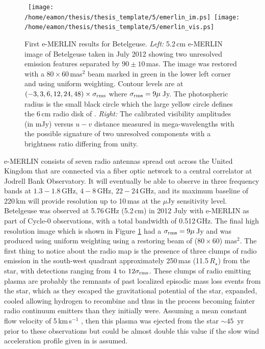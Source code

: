 \begin{figure}[!ht]
\centering 
\mbox{
          \texttt{[image: /home/eamon/thesis/thesis\_template/5/emerlin\_im.ps]}
          \texttt{[image: /home/eamon/thesis/thesis\_template/5/emerlin\_vis.ps]}
          }
\caption[First e-MERLIN results for Betelgeuse.]{First e-MERLIN results for Betelgeuse. \textit{Left:} 5.2\,cm e-MERLIN image of Betelgeuse taken in July 2012 showing two unresolved emission features separated by $90\pm10$\,mas. The image was restored with a $80\times 60$\,mas$^2$ beam marked in green in the lower left corner and using uniform weighting. Contour levels are at $(-3, 3, 6, 12, 24, 48)\times \sigma _{\rm{rms}}$ where $\sigma _{\rm{rms}} = 9\mu$\,Jy. The photospheric radius is the small black circle which the large yellow circle defines the 6\,cm radio disk of \cite{lim_1998}. \textit{Right:} The calibrated visibility amplitudes (in mJy) versus $u-v$ distance measured in mega-wavelengths with the possible signature of two unresolved components with a brightness ratio differing from unity. }
\label{fig:5.13}
\end{figure}

e-MERLIN \citep{muxlow_2003} consists of seven radio antennas spread out across the United Kingdom that are connected via a fiber optic network to a central correlator at Jodrell Bank Observatory. It will eventually be able to observe in three frequency bands at $1.3-1.8$\,GHz, $4-8$\,GHz, $22-24$\,GHz, and its maximum baseline of 220\,km will provide resolution up to 10\,mas at the $\mu$Jy sensitivity level. Betelgeuse was observed at 5.76\,GHz (5.2\,cm) in 2012 July with e-MERLIN as part of Cycle-0 observations, with a total bandwidth of 0.512\,GHz. The final high resolution image which is shown in Figure \ref{fig:5.13} had a $\sigma _{\rm{rms}}=9\mu$\,Jy and was produced using uniform weighting using a restoring beam of ($80\times 60$) mas$^2$. The first thing to notice about the radio map is the presence of three clumps of radio emission in the south-west quadrant approximately 250\,mas (11.5\,$R_{\star}$) from the star, with detections ranging from 4 to $12\sigma _{\rm{rms}}$. These clumps of radio emitting plasma are probably the remnants of past localized episodic mass loss events from the star, which as they escaped the gravitational potential of the star, expanded, cooled allowing hydrogen to recombine and thus in the process becoming fainter radio continuum emitters than they initially were. Assuming a mean constant flow velocity of 5\,km\,s$^{-1}$ \citep[see Figure 10 in][]{harper_2001}, then this plasma was ejected from the star $\sim 45$\, yr prior to these observations but could be almost double this value if the slow wind acceleration profile given in \cite{harper_2001} is assumed.

